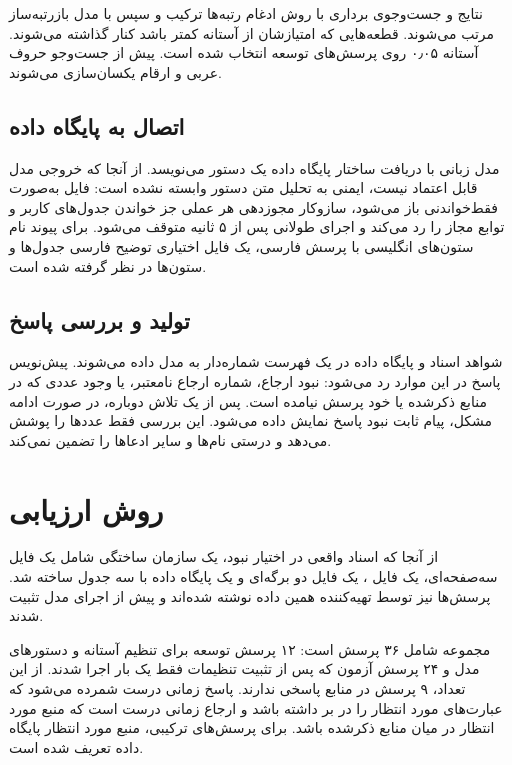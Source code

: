 \documentclass[a4paper,12pt,oneside]{book}
\DeclareRobustCommand{\dec}[1]{\beginL#1\endL}
\newcommand{\en}[1]{\lr{#1}}
\begin{document}
نتایج \en{BM25} و جست‌وجوی برداری با روش ادغام رتبه‌ها ترکیب و سپس با مدل بازرتبه‌ساز مرتب می‌شوند. قطعه‌هایی که امتیازشان از آستانه کمتر باشد کنار گذاشته می‌شوند. آستانه \dec{۰٫۰۵} روی پرسش‌های توسعه انتخاب شده است. پیش از جست‌وجو حروف عربی و ارقام یکسان‌سازی می‌شوند.

\section{اتصال به پایگاه داده}

مدل زبانی با دریافت ساختار پایگاه داده یک دستور \en{SELECT} می‌نویسد. از آنجا که خروجی مدل قابل اعتماد نیست، ایمنی به تحلیل متن دستور وابسته نشده است: فایل به‌صورت فقط‌خواندنی باز می‌شود، سازوکار مجوزدهی \en{SQLite} هر عملی جز خواندن جدول‌های کاربر و توابع مجاز را رد می‌کند و اجرای طولانی پس از ۵ ثانیه متوقف می‌شود. برای پیوند نام ستون‌های انگلیسی با پرسش فارسی، یک فایل اختیاری توضیح فارسی جدول‌ها و ستون‌ها در نظر گرفته شده است.

\section{تولید و بررسی پاسخ}

شواهد اسناد و پایگاه داده در یک فهرست شماره‌دار به مدل داده می‌شوند. پیش‌نویس پاسخ در این موارد رد می‌شود: نبود ارجاع، شماره ارجاع نامعتبر، یا وجود عددی که در منابع ذکرشده یا خود پرسش نیامده است. پس از یک تلاش دوباره، در صورت ادامه مشکل، پیام ثابت نبود پاسخ نمایش داده می‌شود. این بررسی فقط عددها را پوشش می‌دهد و درستی نام‌ها و سایر ادعاها را تضمین نمی‌کند.

\chapter{روش ارزیابی}\label{ch:method}

از آنجا که اسناد واقعی در اختیار نبود، یک سازمان ساختگی شامل یک فایل \en{PDF} سه‌صفحه‌ای، یک فایل \en{Word}، یک فایل \en{Excel} دو برگه‌ای و یک پایگاه داده با سه جدول ساخته شد. پرسش‌ها نیز توسط تهیه‌کننده همین داده نوشته شده‌اند و پیش از اجرای مدل تثبیت شدند.

مجموعه شامل ۳۶ پرسش است: ۱۲ پرسش توسعه برای تنظیم آستانه و دستورهای مدل و ۲۴ پرسش آزمون که پس از تثبیت تنظیمات فقط یک بار اجرا شدند. از این تعداد، ۹ پرسش در منابع پاسخی ندارند. پاسخ زمانی درست شمرده می‌شود که عبارت‌های مورد انتظار را در بر داشته باشد و ارجاع زمانی درست است که منبع مورد انتظار در میان منابع ذکرشده باشد. برای پرسش‌های ترکیبی، منبع مورد انتظار پایگاه داده تعریف شده است.
\end{document}
